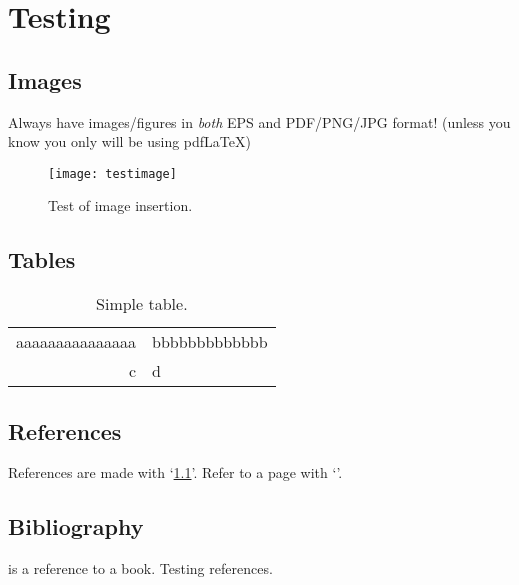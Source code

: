 \chapter{Testing}
\section{Images}
Always have images/figures in \emph{both} EPS and PDF/PNG/JPG format! (unless you know you only will be using pdfLaTeX)


\begin{figure}[!tbh]
	\centering
	\texttt{[image: testimage]}
	\caption{Test of image insertion.}
	\label{fig:testimage}
\end{figure}

\section{Tables}
\begin{table}[!h]
\centering%
\caption{Simple table.}\label{tab:table}
\begin{tabular}{| r l |}
   \hline
   aaaaaaaaaaaaaaa & bbbbbbbbbbbbb\\
   c & d\\
   \hline
\end{tabular}
\end{table}

\section{References} References are made with `\ref{tab:table}'. Refer to a page with 
`\pageref{tab:tabel}'.

\section{Bibliography} \cite{Deitel:2002} is a reference to a book. Testing\cite{FrameSynchronization}\cite{CyclingHammingCodes}\cite{ProductCodes} references.
